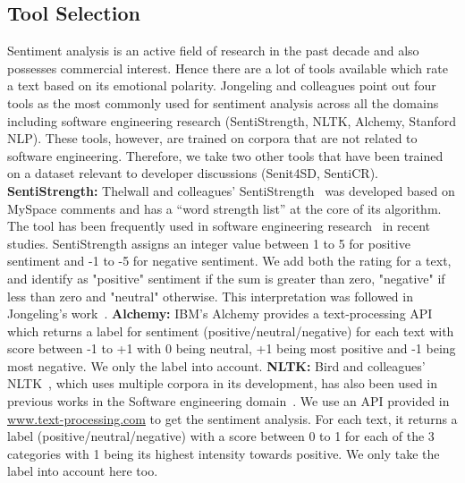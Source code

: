 \subsection{Tool Selection}
Sentiment analysis is an active field of research 
in the past decade 
and also possesses commercial interest. 
Hence there are a lot of tools available 
which rate a text based on its emotional polarity. 
Jongeling and colleagues point out four tools 
as the most commonly used for sentiment analysis 
across all the domains 
including software engineering research 
(SentiStrength, NLTK, Alchemy, Stanford NLP).
These tools, however, are trained on corpora that are not related to software engineering.
Therefore, we take two other tools that have been trained on a dataset relevant to developer discussions (Senit4SD, SentiCR). 
\newline
\indent \textbf{SentiStrength:} Thelwall and colleagues' SentiStrength~\cite{thelwall2010sentiment} 
was developed based on MySpace comments and 
has a ``word strength list'' at the core of its algorithm. 
The tool has been frequently used in software engineering research~\cite{garcia2013role,guzman2014sentiment,novielli2015challenges,guzman2013towards} in recent studies. SentiStrength assigns an integer value between 1 to 5 for positive sentiment and -1 to -5 for negative sentiment. We add both the rating for a text, and identify as "positive" sentiment if the sum is greater than zero, "negative" if less than zero and "neutral" otherwise. This interpretation was followed in Jongeling's work~\cite{jongeling2017negative}.
\newline
\indent\textbf{Alchemy:} IBM's Alchemy 
provides a text-processing API which returns a label for sentiment (positive/neutral/negative) for each text with score between -1 to +1 with 0 being neutral, +1 being most positive and -1 being most negative. We only the label into account.
\newline
\indent\textbf{NLTK:} Bird and colleagues' NLTK~\cite{bird2009natural}, 
which uses multiple corpora in its development, 
has also been used in previous works 
in the Software engineering domain~\cite{pletea2014security,rousinopoulos2014sentiment}. 
We use an API provided in \href{www.text-processing.com}{www.text-processing.com} to get the sentiment analysis. For each text, it returns a label (positive/neutral/negative) with a score between 0 to 1 for each of the 3 categories with 1 being its highest intensity towards positive. We only take the label into account here too.
